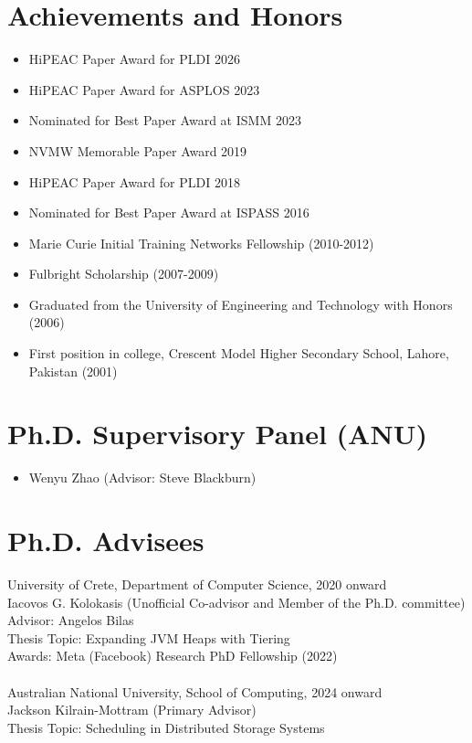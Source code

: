 \documentclass[singlecolumn,singlespace,11pt,a4paper]{article}
\begin{document}
\section*{Achievements and Honors}
\begin{itemize}
\item HiPEAC Paper Award for PLDI 2026
\item HiPEAC Paper Award for ASPLOS 2023
\item Nominated for Best Paper Award at ISMM 2023
\item NVMW Memorable Paper Award 2019
\item HiPEAC Paper Award for PLDI 2018 
\item Nominated for Best Paper Award at ISPASS 2016 
\item Marie Curie Initial Training Networks Fellowship (2010-2012)
\item Fulbright Scholarship (2007-2009)
\item Graduated from the University of Engineering and Technology with Honors (2006)
\item First position in college, Crescent Model Higher Secondary School, Lahore, Pakistan (2001)
\end{itemize}

\section*{Ph.D. Supervisory Panel (ANU)}

\begin{itemize}
\item Wenyu Zhao (Advisor: Steve Blackburn)
\end{itemize}

\section*{Ph.D. Advisees}
University of Crete, Department of Computer Science, 2020 onward\\
\indent Iacovos G. Kolokasis (Unofficial Co-advisor and Member of the Ph.D. committee) \\
\indent Advisor: Angelos Bilas \\ 
\indent Thesis Topic: Expanding JVM Heaps with Tiering \\ 
\indent Awards: Meta (Facebook) Research PhD Fellowship (2022)
\\
\\
Australian National University, School of Computing, 2024 onward\\
\indent Jackson Kilrain-Mottram (Primary Advisor) \\
\indent Thesis Topic: Scheduling in Distributed Storage Systems
\end{document}

